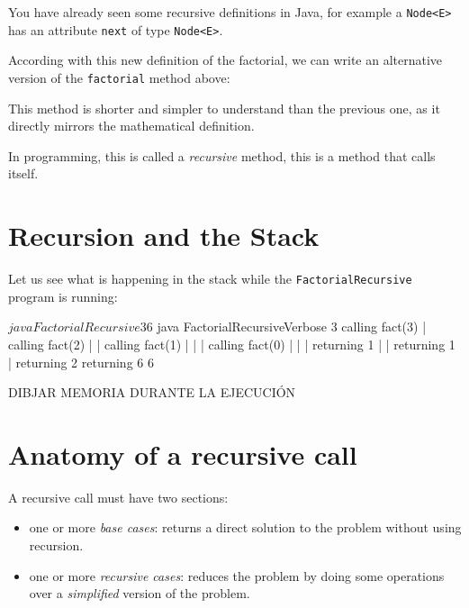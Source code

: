 \documentclass[a4paper, 9pt]{extarticle}
\begin{document}
You have already seen some recursive definitions in Java, for example a \verb+Node<E>+ has an attribute \texttt{next} of type \verb+Node<E>+.

According with this new definition of the factorial, we can write an
alternative version of the \verb+factorial+ method above:


This method is shorter and simpler to understand than the previous one, as it
directly mirrors the mathematical definition.

In programming, this is called a \emph{recursive} method, this is a method that calls itself.





\section{Recursion and the Stack}

Let us see what is happening in the stack while the \texttt{FactorialRecursive} program is running:

\begin{blackboard}
$ java FactorialRecursive 3
6
$ java FactorialRecursiveVerbose 3
calling fact(3)
|  calling fact(2)
|  |  calling fact(1)
|  |  |  calling fact(0)
|  |  |  returning 1
|  |  returning 1
|  returning 2
returning 6
6
\end{blackboard}

DIBJAR MEMORIA DURANTE LA EJECUCIÓN




\section{Anatomy of a recursive call}

A recursive call must have two sections:

\begin{itemize}

\item one or more \emph{base cases}: returns a direct solution to the problem
  without using recursion.


\item one or more \emph{recursive cases}: reduces the problem by doing some
  operations over a \emph{simplified} version of the problem.


\end{itemize}
\end{document}
